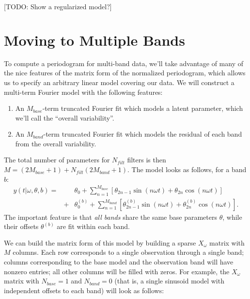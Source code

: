 \documentclass[12pt,preprint]{aastex}
\newcommand{\todo}[1]{{\color{red} [TODO: #1]}}
\begin{document}
\todo{Show a regularized model?}

\section{Moving to Multiple Bands}

To compute a periodogram for multi-band data, we'll take advantage of many of the nice features of the matrix form of the normalized periodogram, which allows us to specify an arbitrary linear model covering our data. We will construct a multi-term Fourier model with the following features:
\begin{enumerate}
  \item An $M_{base}$-term truncated Fourier fit which models a latent parameter, which we'll call the ``overall variability''.
  \item An $M_{band}$-term truncated Fourier fit which models the residual of each band from the overall variability.
\end{enumerate}
The total number of parameters for $N_{filt}$ filters is then $M = (2M_{base} + 1) + N_{filt}(2M_{band} + 1)$. The model looks as follows, for a band $b$:
\begin{eqnarray}
  y(t|\omega,\theta,b) = &&\theta_0 + \sum_{n=1}^{M_{base}} \left[\theta_{2n - 1}\sin(n\omega t) + \theta_{2n}\cos(n\omega t)\right]\\ 
  &+& \theta^{(b)}_0 + \sum_{n=1}^{M_{band}} \left[\theta^{(b)}_{2n - 1}\sin(n\omega t) + \theta^{(b)}_{2n}\cos(n\omega t)\right].
\end{eqnarray}
The important feature is that {\it all bands} share the same base parameters $\theta$, while their offsets $\theta^{(b)}$ are fit within each band.

We can build the matrix form of this model by building a sparse $X_{\omega}$ matrix with $M$ columns. Each row corresponds to a single observation through a single band; columns corresponding to the base model and the observation band will have nonzero entries; all other columns will be filled with zeros. For example, the $X_\omega$ matrix with $N_{base}=1$ and $N_{band}=0$ (that is, a single sinusoid model with independent offsets to each band) will look as follows:
\end{document}
